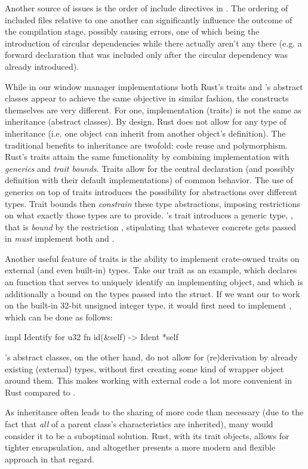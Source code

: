 Another source of issues is the order of include directives in \cpp. The
ordering of included files relative to one another can significantly influence
the outcome of the compilation stage, possibly causing errors, one of which
being the introduction of circular dependencies while there actually aren't any
there (e.g. a forward declaration that was included only after the circular
dependency was already introduced).

While in our window manager implementations both Rust's traits and \cpp's
abstract classes appear to achieve the same objective in similar fashion, the
constructs themselves are very different. For one, implementation (traits)
is not the same as inheritance (abstract classes). By design, Rust does not
allow for any type of inheritance (i.e. one object can inherit from another
object's definition). The traditional benefits to inheritance are twofold:
code reuse and polymorphism. Rust's traits attain the same functionality
by combining implementation with \textit{generics} and \textit{trait
bounds}\cite{therustbook, rustblogtraits}. Traits allow for the central
declaration (and possibly definition with their default implementations) of
common behavior\cite{therustbook, rustblogtraits}. The use of generics on
top of traits introduces the possibility for abstractions over different
types\cite{therustbook, rustblogtraits}. Trait bounds then \textit{constrain}
these type abstractions, imposing restrictions on what exactly those types
are to provide\cite{therustbook, rustblogtraits, therustreference}. \wmrs's
 trait introduces a generic type, , that is \textit{bound}
by the restriction , stipulating that whatever concrete
 gets passed in \textit{must} implement both  and
.

Another useful feature of traits is the ability to implement crate-owned
traits on external (and even built-in) types. Take our  trait
as an example, which declares an  function that serves to uniquely
identify an implementing object, and which is additionally a bound on the types
passed into the  struct. If we want our  to work on
the built-in 32-bit unsigned integer type, it would first need to implement
, which can be done as follows:

\begin{rustblock}
  impl Identify for u32 {
    fn id(&self) -> Ident {
      *self
    }
  }
\end{rustblock}

\cpp's abstract classes, on the other hand, do not allow for (re)derivation by
already existing (external) types, without first creating some kind of wrapper
object around them. This makes working with external code a lot more convenient
in Rust compared to \cpp.

As inheritance often leads to the sharing of more code than necessary (due to
the fact that \textit{all} of a parent class's characteristics are inherited),
many would consider it to be a suboptimal solution. Rust, with its trait
objects, allows for tighter encapsulation, and altogether presents a more modern
and flexible approach in that regard.
